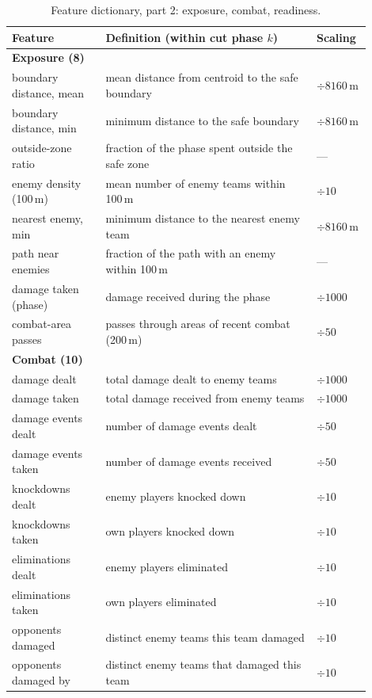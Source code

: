 \begin{table}[t]
\centering
\caption{Feature dictionary, part 2: exposure, combat, readiness.}
\label{tab:feat-dict-b}
\footnotesize
\begin{tabular}{p{0.24\linewidth}p{0.54\linewidth}p{0.12\linewidth}}
\toprule
Feature & Definition (within cut phase \(k\)) & Scaling \\
\midrule
\multicolumn{3}{l}{\textbf{Exposure (8)}} \\
boundary distance, mean & mean distance from centroid to the safe boundary & \(\div 8160\)\,m \\
boundary distance, min & minimum distance to the safe boundary & \(\div 8160\)\,m \\
outside-zone ratio & fraction of the phase spent outside the safe zone & --- \\
enemy density (100\,m) & mean number of enemy teams within 100\,m & \(\div 10\) \\
nearest enemy, min & minimum distance to the nearest enemy team & \(\div 8160\)\,m \\
path near enemies & fraction of the path with an enemy within 100\,m & --- \\
damage taken (phase) & damage received during the phase & \(\div 1000\) \\
combat-area passes & passes through areas of recent combat (200\,m) & \(\div 50\) \\
\midrule
\multicolumn{3}{l}{\textbf{Combat (10)}} \\
damage dealt & total damage dealt to enemy teams & \(\div 1000\) \\
damage taken & total damage received from enemy teams & \(\div 1000\) \\
damage events dealt & number of damage events dealt & \(\div 50\) \\
damage events taken & number of damage events received & \(\div 50\) \\
knockdowns dealt & enemy players knocked down & \(\div 10\) \\
knockdowns taken & own players knocked down & \(\div 10\) \\
eliminations dealt & enemy players eliminated & \(\div 10\) \\
eliminations taken & own players eliminated & \(\div 10\) \\
opponents damaged & distinct enemy teams this team damaged & \(\div 10\) \\
opponents damaged by & distinct enemy teams that damaged this team & \(\div 10\) \\

\end{tabular}
\end{table}
